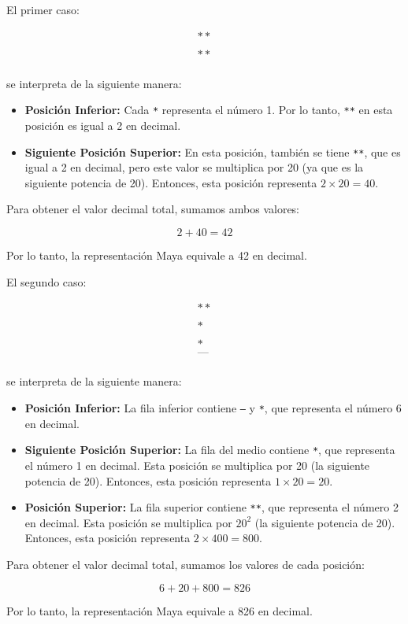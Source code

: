 \explanationText

El primer caso:

\[
\begin{array}{c}
** \\
\\
** \\
\end{array}
\]

se interpreta de la siguiente manera:

\begin{itemize}
    \item \textbf{Posición Inferior:} Cada \texttt{*} representa el número 1. Por lo tanto, \texttt{**} en esta posición es igual a 2 en decimal.
    \item \textbf{Siguiente Posición Superior:} En esta posición, también se tiene \texttt{**}, que es igual a 2 en decimal, pero este valor se multiplica por 20 (ya que es la siguiente potencia de 20). Entonces, esta posición representa $2 \times 20 = 40$.
\end{itemize}

Para obtener el valor decimal total, sumamos ambos valores:

\[
2 + 40 = 42
\]

Por lo tanto, la representación Maya equivale a 42 en decimal.

\newpage
El segundo caso:

\[
\begin{array}{c}
** \\
\\
*
\\
\\
* \\
\texttt{---} \\
\end{array}
\]

se interpreta de la siguiente manera:

\begin{itemize}
    \item \textbf{Posición Inferior:} La fila inferior contiene \texttt{---} y \texttt{*}, que representa el número 6 en decimal.
    \item \textbf{Siguiente Posición Superior:} La fila del medio contiene \texttt{*}, que representa el número 1 en decimal. Esta posición se multiplica por 20 (la siguiente potencia de 20). Entonces, esta posición representa $1 \times 20 = 20$.
    \item \textbf{Posición Superior:} La fila superior contiene \texttt{**}, que representa el número 2 en decimal. Esta posición se multiplica por $20^2$ (la siguiente potencia de 20). Entonces, esta posición representa 
    $2 \times 400 = 800$.
\end{itemize}

Para obtener el valor decimal total, sumamos los valores de cada posición:

\[
6 + 20 + 800 = 826
\]

Por lo tanto, la representación Maya equivale a 826 en decimal.